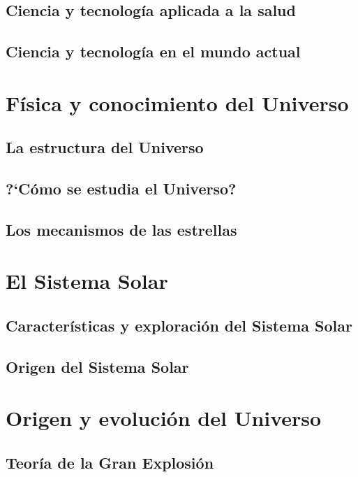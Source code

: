 \documentclass[11pt]{book}
\begin{document}
\subsection{Ciencia y tecnolog\'ia aplicada a la salud}
\subsection{Ciencia y tecnolog\'ia en el mundo actual}

\section{F\'isica y conocimiento del Universo}
\subsection{La estructura del Universo}
\subsection{?`C\'omo se estudia el Universo?}
\subsection{Los mecanismos de las estrellas}

\section{El Sistema Solar}
\subsection{Caracter\'isticas y exploraci\'on del Sistema Solar}
\subsection{Origen del Sistema Solar}

\section{Origen y evoluci\'on del Universo}
\subsection{Teor\'ia de la Gran Explosi\'on}
\end{document}
